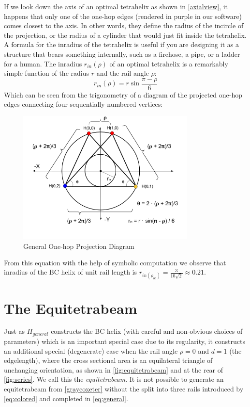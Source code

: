 \documentclass[review]{siamonline1116}
\begin{document}
If we look down the axis of an optimal tetrahelix as shown in \cref{axialview}, it happens that only one of the one-hop edges
(rendered in purple in our software)
comes closest to the axis. In other words, they define the radius of the incircle of the
projection, or the radius of a cylinder that would just fit inside the tetrahelix.
A formula for the inradius of the tetrahelix is useful if you are designing it as a structure that bears something internally,
such as a firehose, a pipe, or
a ladder for a human. The inradius $r_{in}(\rho)$ of
an optimal tetrahelix is a remarkably simple function of the radius $r$ and the rail angle $\rho$:
\begin{equation}
  \label{eq:inradius}
  r_{in}(\rho) = r \sin{\frac{\pi - \rho}{6}}
\end{equation}
Which can be seen from the trigonometry of a diagram of the projected one-hop edges
connecting four sequentially numbered vertices:

\begin{figure}[H]
     \centering
     \includegraphics[width=0.8\textwidth]{figures/ProjectionDiagram.png}
     \caption{General One-hop Projection Diagram}
  \label{projectiondiagram}
     
\end{figure}

From this equation with the help of symbolic computation we observe that inradius of the BC helix of unit rail length is $r_{in(\rho_{bc})} = \frac{3}{10\sqrt{2}} \approx 0.21$.

\section{The Equitetrabeam}
\label{sec:equitetrabeam}

Just as $H_{general}$ constructs the BC helix (with careful and non-obvious choices of parameters)
which is an important
special case due to its regularity, it constructs an additional special
(degenerate) case when the rail angle $\rho = 0$
and $d = 1$ (the edgelength), where the cross sectional area is
an equilateral triangle of unchanging orientation, as shown in \cref{fig:equitetrabeam} and at the rear of \cref{fig:series}.
We call this the \emph{equitetrabeam}. It is not possible to generate an equitetrabeam from \cref{graycoxeter}
without the split into three rails introduced by \cref{eq:colored} and completed in \cref{eq:general}.
\end{document}
